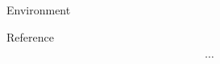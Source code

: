 \documentclass[sigconf]{acmart}
\begin{document}
Environment

Reference

\[
  \cdots
\]
\end{document}
